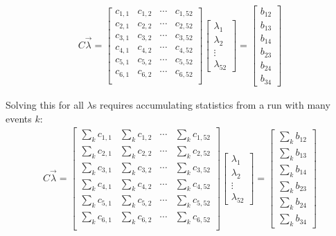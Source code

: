 \begin{itemize}
\begin{gather}
    C\vec{\lambda}
    =
    \begin{bmatrix}
        c_{1,1} & c_{1,2} & \cdots & c_{1,52} \\
        c_{2,1} & c_{2,2} & \cdots & c_{2,52} \\
        c_{3,1} & c_{3,2} & \cdots & c_{3,52} \\
        c_{4,1} & c_{4,2} & \cdots & c_{4,52} \\
        c_{5,1} & c_{5,2} & \cdots & c_{5,52} \\
        c_{6,1} & c_{6,2} & \cdots & c_{6,52} \\
    \end{bmatrix}
    \left[ \begin{array}{c} \lambda_1 \\ \lambda_2 \\ \vdots \\ \lambda_{52} \end{array} \right]
    =
    \left[ \begin{array}{c} b_{12} \\ b_{13} \\ b_{14} \\ b_{23} \\ b_{24} \\ b_{34}  \end{array} \right]
\end{gather}

Solving this for all $\lambda$s requires accumulating statistics from a run with
many events $k$:
\begin{gather}
    C\vec{\lambda}
    =
    \begin{bmatrix}
        \sum_k c_{1,1} & \sum_k c_{1,2} & \cdots & \sum_k c_{1,52} \\
        \sum_k c_{2,1} & \sum_k c_{2,2} & \cdots & \sum_k c_{2,52} \\
        \sum_k c_{3,1} & \sum_k c_{3,2} & \cdots & \sum_k c_{3,52} \\
        \sum_k c_{4,1} & \sum_k c_{4,2} & \cdots & \sum_k c_{4,52} \\
        \sum_k c_{5,1} & \sum_k c_{5,2} & \cdots & \sum_k c_{5,52} \\
        \sum_k c_{6,1} & \sum_k c_{6,2} & \cdots & \sum_k c_{6,52} \\
    \end{bmatrix}
    \left[ \begin{array}{c} \lambda_1 \\ \lambda_2 \\ \vdots \\ \lambda_{52} \end{array} \right]
    =
    \left[ \begin{array}{c}  \sum_k b_{12} \\  \sum_k b_{13} \\  \sum_k b_{14} \\  \sum_k b_{23} \\  \sum_k b_{24} \\  \sum_k b_{34}  \end{array} \right]
\end{gather}


\end{itemize}
